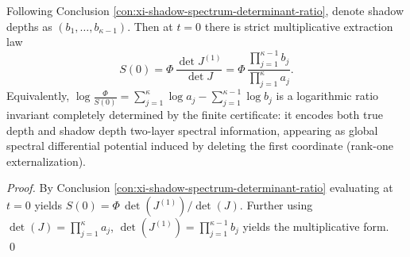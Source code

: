 \begin{corollary}[Multiplicative Extraction of Shadow Spectrum--Determinant Ratio: Logarithmic Ratio Invariant of Depths and Shadow Depths at \texorpdfstring{$t=0$}{t=0}]\label{cor:xi-shadow-spectrum-determinant-ratio-at-zero}
Following Conclusion \ref{con:xi-shadow-spectrum-determinant-ratio}, denote shadow depths as \((b_1,\dots,b_{\kappa-1})\).
Then at \(t=0\) there is strict multiplicative extraction law
\[
\boxed{\;
S(0)=\Phi\,\frac{\det J^{(1)}}{\det J}
=\Phi\,\frac{\prod_{j=1}^{\kappa-1}b_j}{\prod_{j=1}^{\kappa}a_j}.\;}
\]
Equivalently,
\(
\log\frac{\Phi}{S(0)}=\sum_{j=1}^{\kappa}\log a_j-\sum_{j=1}^{\kappa-1}\log b_j
\)
is a logarithmic ratio invariant completely determined by the finite certificate: it encodes both true depth and shadow depth two-layer spectral information, appearing as global spectral differential potential induced by deleting the first coordinate (rank-one externalization).
\end{corollary}
\begin{proof}
By Conclusion \ref{con:xi-shadow-spectrum-determinant-ratio} evaluating at \(t=0\) yields
\(
S(0)=\Phi\,\det(J^{(1)})/\det(J)
\).
Further using \(\det(J)=\prod_{j=1}^{\kappa}a_j\), \(\det(J^{(1)})=\prod_{j=1}^{\kappa-1}b_j\) yields the multiplicative form. \qed
\end{proof}

